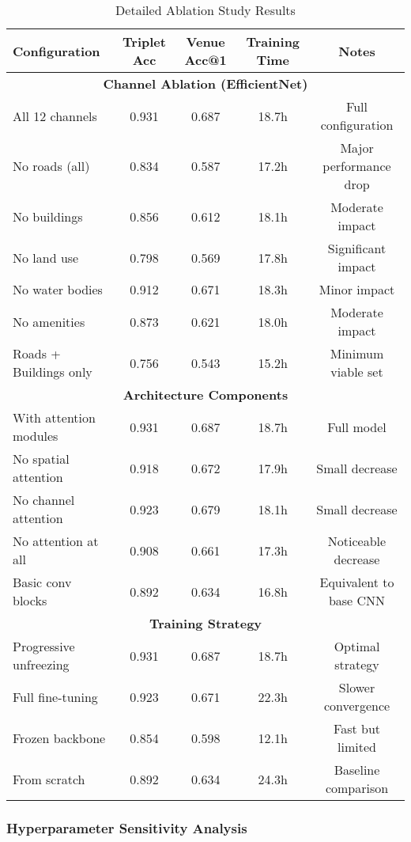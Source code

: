 \begin{table}[H]
\centering
\caption{Detailed Ablation Study Results}
\begin{tabular}{|l|c|c|c|c|}
\hline
\textbf{Configuration} & \textbf{Triplet Acc} & \textbf{Venue Acc@1} & \textbf{Training Time} & \textbf{Notes} \\
\hline
\multicolumn{5}{|c|}{\textbf{Channel Ablation (EfficientNet)}} \\
\hline
All 12 channels & 0.931 & 0.687 & 18.7h & Full configuration \\
No roads (all) & 0.834 & 0.587 & 17.2h & Major performance drop \\
No buildings & 0.856 & 0.612 & 18.1h & Moderate impact \\
No land use & 0.798 & 0.569 & 17.8h & Significant impact \\
No water bodies & 0.912 & 0.671 & 18.3h & Minor impact \\
No amenities & 0.873 & 0.621 & 18.0h & Moderate impact \\
Roads + Buildings only & 0.756 & 0.543 & 15.2h & Minimum viable set \\
\hline
\multicolumn{5}{|c|}{\textbf{Architecture Components}} \\
\hline
With attention modules & 0.931 & 0.687 & 18.7h & Full model \\
No spatial attention & 0.918 & 0.672 & 17.9h & Small decrease \\
No channel attention & 0.923 & 0.679 & 18.1h & Small decrease \\
No attention at all & 0.908 & 0.661 & 17.3h & Noticeable decrease \\
Basic conv blocks & 0.892 & 0.634 & 16.8h & Equivalent to base CNN \\
\hline
\multicolumn{5}{|c|}{\textbf{Training Strategy}} \\
\hline
Progressive unfreezing & 0.931 & 0.687 & 18.7h & Optimal strategy \\
Full fine-tuning & 0.923 & 0.671 & 22.3h & Slower convergence \\
Frozen backbone & 0.854 & 0.598 & 12.1h & Fast but limited \\
From scratch & 0.892 & 0.634 & 24.3h & Baseline comparison \\
\hline
\end{tabular}
\end{table}

\subsubsection{Hyperparameter Sensitivity Analysis}

